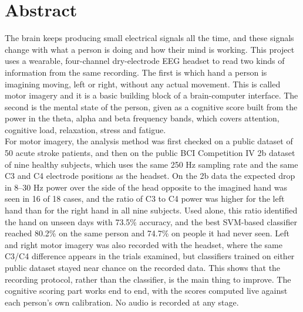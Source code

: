 \chapter*{Abstract}
\thispagestyle{plain}
The brain keeps producing small electrical signals all the time, and these signals change
with what a person is doing and how their mind is working. This project uses a wearable,
four-channel dry-electrode EEG headset to read two kinds of information from the same
recording. The first is which hand a person is imagining moving, left or right, without any
actual movement. This is called motor imagery and it is a basic building block of a
brain-computer interface. The second is the mental state of the person, given as a
cognitive score built from the power in the theta, alpha and beta frequency bands, which
covers attention, cognitive load, relaxation, stress and fatigue.\\

For motor imagery, the analysis method was first checked on a public dataset of 50 acute
stroke patients, and then on the public BCI Competition IV 2b dataset of nine healthy
subjects, which uses the same 250 Hz sampling rate and the same C3 and C4 electrode
positions as the headset. On the 2b data the expected drop in 8--30 Hz power over the side
of the head opposite to the imagined hand was seen in 16 of 18 cases, and the ratio of C3
to C4 power was higher for the left hand than for the right hand in all nine subjects.
Used alone, this ratio identified the hand on unseen days with 73.5\% accuracy, and the
best SVM-based classifier reached 80.2\% on the same person and 74.7\% on people it had
never seen. Left and right motor imagery was also recorded with the headset, where the
same C3/C4 difference appears in the trials examined, but classifiers trained on either
public dataset stayed near chance on the recorded data. This shows that the recording
protocol, rather than the classifier, is the main thing to improve. The cognitive scoring
part works end to end, with the scores computed live against each person's own
calibration. No audio is recorded at any stage.
